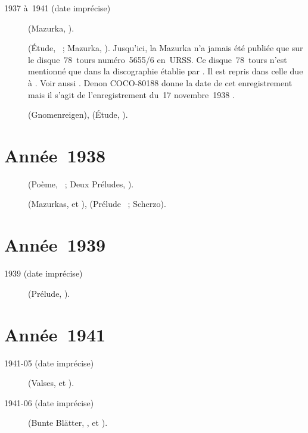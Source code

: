 \begin{description}
 \item[1937 à~1941 (date imprécise)]
 \Chopin{} (Mazurka,  ).
 \item[]
 \Chopin{} (Étude,  ~; Mazurka,  ).
 Jusqu'ici, la Mazurka n'a jamais été publiée que sur le disque~78~tours
 numéro~5655/6 en~URSS.
 Ce disque~78~tours n'est mentionné que dans la discographie établie par
 \citet[p.~1]{Nikonovich11}.
 Il est repris dans celle due à \citet[p.~65]{Malik}.
 Voir aussi \citet[p.~375]{Scriabine}.
 Denon COCO-80188 donne la date de cet enregistrement mais il s'agit de
 l'enregistrement du~17 novembre~1938 \citep[voir][p.~65 et note~3]{Malik}.
 \item[]
 \Liszt{} (Gnomenreigen), \Scriabine{} (Étude,  ).
\end{description}

\section{Année~1938}

\begin{description}
 \item[]
 \Scriabine{} (Poème,  ~; Deux Préludes, ).
 \item[]
 \Chopin{} (Mazurkas,   et  ),
 \Goltz{} (Prélude ~; Scherzo).
\end{description}

\section{Année~1939}

\begin{description}
 \item[1939 (date imprécise)]
 \Scriabine{} (Prélude,  ).
\end{description}

\section{Année~1941}

\begin{description}
 \item[1941-05 (date imprécise)]
 \Chopin{} (Valses,   et  ).
 \item[1941-06 (date imprécise)]
 \Schumann{} (Bunte Blätter,  ,  et
 ).
\end{description}

